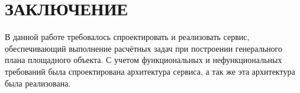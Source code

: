 \section*{\Large{ЗАКЛЮЧЕНИЕ}}
В данной работе требовалось спроектировать и реализовать сервис, обеспечивающий
выполнение расчётных задач при построении генерального плана площадного объекта.
С учетом функциональных и нефункциональных требований была спроектирована архитектура сервиса,
а так же эта архитектура была реализована.
